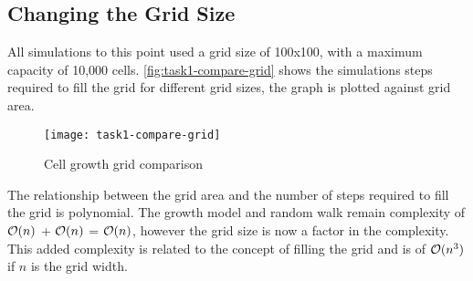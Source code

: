 \clearpage

\subsection{Changing the Grid Size}

All simulations to this point used a grid size of 100x100, with a maximum capacity of 10,000 cells.
\autoref{fig:task1-compare-grid} shows the simulations steps required to fill the grid for different grid sizes,
the graph is plotted against grid area.

\begin{figure}[ht]
    \centering
    \texttt{[image: task1-compare-grid]}
    \caption[Cell growth grid comparison]{Cell growth grid comparison}
    \label{fig:task1-compare-grid}
\end{figure}

The relationship between the grid area and the number of steps required to fill the grid is polynomial.
The growth model and random walk remain complexity of $\mathcal{O}(n)$ + $\mathcal{O}(n)$ = $\mathcal{O}(n)$,
however the grid size is now a factor in the complexity.
This added complexity is related to the concept of filling the grid and is of $\mathcal{O}(n^3)$ if $n$ is the grid width.